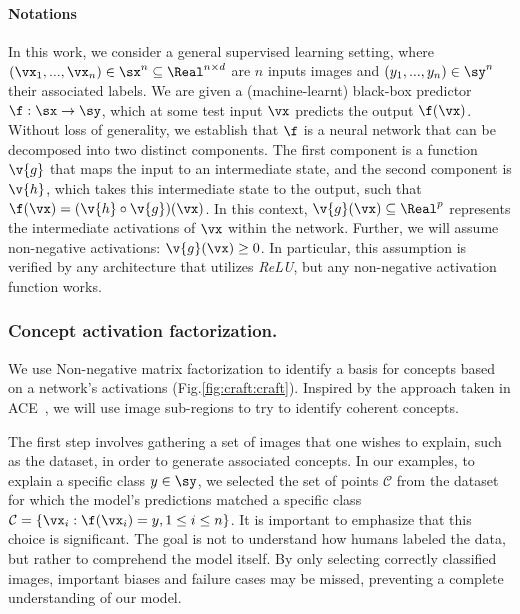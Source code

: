\paragraph{Notations}
In this work, we consider a general supervised learning setting, where $(\vx_1, ..., \vx_n) \in \sx^n \subseteq \Real^{n \times d}$ are $n$ inputs images and $(y_1, ..., y_n) \in \sy^n$ their associated labels. 
We are given a (machine-learnt) black-box predictor $\f : \sx \to \sy$, which at some test input $\vx$ predicts the output $\f(\vx)$.
Without loss of generality, we establish that $\f$ is a neural network that can be decomposed into two distinct components. The first component is a function $\v{g}$ that maps the input to an intermediate state, and the second component is $\v{h}$, which takes this intermediate state to the output, such that $\f(\vx) = (\v{h} \circ \v{g})(\vx)$. In this context, $\v{g}(\vx) \subseteq \Real^p$ represents the intermediate activations of $\vx$ within the network.
Further, we will assume non-negative activations: $ \v{g}(\vx) \geq 0$. In particular, this assumption is verified by any architecture that utilizes \textit{ReLU}, but any non-negative activation function works. 



\subsubsection{Concept activation factorization.}\label{subsec:caf}

We use Non-negative matrix factorization to identify a basis for concepts based on a network's activations (Fig.\ref{fig:craft:craft}). Inspired by the approach taken in ACE~\cite{ghorbani2019towards}, we will use image sub-regions to try to identify coherent concepts. 

The first step involves gathering a set of images that one wishes to explain, such as the dataset, in order to generate associated concepts. In our examples, to explain a specific class $y \in \sy$, we selected the set of points $\mathcal{C}$ from the dataset for which the model's predictions matched a specific class $\mathcal{C} = \{ \vx_i : \f(\vx_i) = y, 1 \leq i \leq n \}$.
It is important to emphasize that this choice is significant. The goal is not to understand how humans labeled the data, but rather to comprehend the model itself. By only selecting correctly classified images, important biases and failure cases may be missed, preventing a complete understanding of our model.

